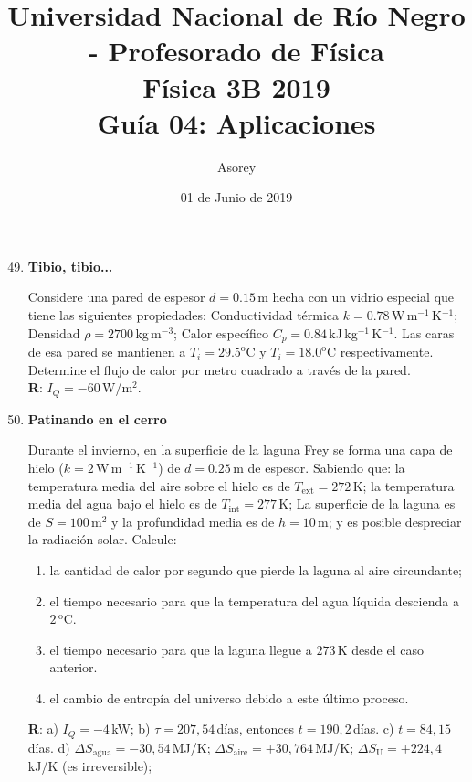 \documentclass[a4paper,12pt]{article}
\begin{document}
\title{
{\normalsize{Universidad Nacional de Río Negro - Profesorado de Física}}\\
Física 3B 2019 \\ Guía 04: Aplicaciones
}
\author{Asorey}
\date{01 de Junio de 2019}
\maketitle

\begin{enumerate}
	\setcounter{enumi}{48}     

	\item{\bf{Tibio, tibio...}}

		Considere una pared de espesor $d=0.15$\,m hecha con un vidrio especial
		que tiene las siguientes propiedades: Conductividad térmica
		$k=0.78$\,W\,m$^{-1}$\,K$^{-1}$; Densidad $\rho = 2700$\,kg\,m$^{-3}$;
		Calor específico $C_p = 0.84$\,kJ\,kg$^{-1}$\,K$^{-1}$.  Las caras de
		esa pared se mantienen a $T_i=29.5^\mathrm{o}$C y
		$T_i=18.0^\mathrm{o}$C respectivamente. Determine el flujo de calor por
		metro cuadrado a través de la pared.
		\\{\bf{R}}: $I_Q=-60$\,W/m$^2$.
	
	\item{\bf{Patinando en el cerro}}
		
		Durante el invierno, en la superficie de la laguna Frey se forma una
		capa de hielo ($k=2$\,W\,m$^{-1}$\,K$^{-1}$) de $d=0.25$\,m de espesor.
		Sabiendo que: la temperatura media del aire sobre el hielo es de
		$T_\mathrm{ext}=272$\,K; la temperatura media del agua bajo el hielo es
		de $T_\mathrm{int}=277$\,K; La superficie de la laguna es de
		$S=100$\,m$^2$ y la profundidad media es de $h=10$\,m; y es posible
		despreciar la radiación solar. Calcule:
		\begin{enumerate}
			\item la cantidad de calor por segundo que pierde la laguna al
				aire circundante;
			\item el tiempo necesario para que la temperatura del agua líquida
				descienda a $2$\,$^\mathrm{o}$C.
			\item el tiempo necesario para que la laguna llegue a $273$\,K
				desde el caso anterior.
			\item el cambio de entropía del universo debido a este último proceso.
		\end{enumerate}
		{\bf{R}}: a) $I_Q=-4$\,kW; b) $\tau=207,54$\,días, entonces
		$t=190,2$\,días. c) $t=84,15$\,días. d) $\Delta
		S_{\mathrm{agua}}=-30,54$\,MJ/K; $\Delta
		S_{\mathrm{aire}}=+30,764$\,MJ/K; $\Delta S_{\mathrm{U}}=+224,4$\,kJ/K
		(es irreversible);
	

\end{enumerate}
\end{document}
